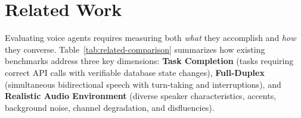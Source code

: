 \section{Related Work}
\label{sec:related}

Evaluating voice agents requires measuring both \textit{what} they accomplish and \textit{how} they converse. Table~\ref{tab:related-comparison} summarizes how existing benchmarks address three key dimensions: \textbf{Task Completion} (tasks requiring correct API calls with verifiable database state changes), \textbf{Full-Duplex} (simultaneous bidirectional speech with turn-taking and interruptions), and \textbf{Realistic Audio Environment} (diverse speaker characteristics, accents, background noise, channel degradation, and disfluencies).

\begin{table}[ht]
\caption{Comparison of evaluation dimensions across benchmarks. Prior work advances individual dimensions; \tauvoice{} combines all three.}
\label{tab:related-comparison}
\centering
\begin{small}
\end{small}
\end{table}

